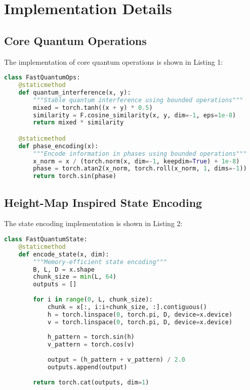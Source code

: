 \documentclass[twocolumn]{article}
\begin{document}
\section{Implementation Details}

\subsection{Core Quantum Operations}
The implementation of core quantum operations is shown in Listing 1:

\begin{lstlisting}[language=Python, caption=Core Quantum Operations Implementation]
class FastQuantumOps:
    @staticmethod
    def quantum_interference(x, y):
        """Stable quantum interference using bounded operations"""
        mixed = torch.tanh((x + y) * 0.5)
        similarity = F.cosine_similarity(x, y, dim=-1, eps=1e-8)
        return mixed * similarity

    @staticmethod
    def phase_encoding(x):
        """Encode information in phases using bounded operations"""
        x_norm = x / (torch.norm(x, dim=-1, keepdim=True) + 1e-8)
        phase = torch.atan2(x_norm, torch.roll(x_norm, 1, dims=-1))
        return torch.sin(phase)
\end{lstlisting}

\subsection{Height-Map Inspired State Encoding}
The state encoding implementation is shown in Listing 2:

\begin{lstlisting}[language=Python, caption=Height-Map State Encoding Implementation]
class FastQuantumState:
    @staticmethod
    def encode_state(x, dim):
        """Memory-efficient state encoding"""
        B, L, D = x.shape
        chunk_size = min(L, 64)
        outputs = []
        
        for i in range(0, L, chunk_size):
            chunk = x[:, i:i+chunk_size, :].contiguous()
            h = torch.linspace(0, torch.pi, D, device=x.device)
            v = torch.linspace(0, torch.pi, D, device=x.device)
            
            h_pattern = torch.sin(h)
            v_pattern = torch.cos(v)
            
            output = (h_pattern + v_pattern) / 2.0
            outputs.append(output)
        
        return torch.cat(outputs, dim=1)
\end{lstlisting}
\end{document}
